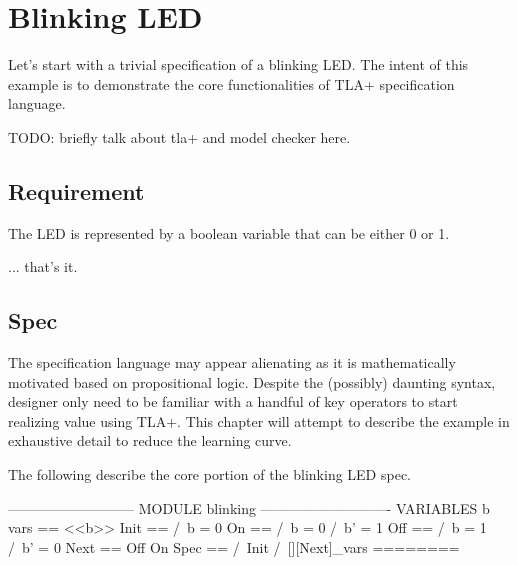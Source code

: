\chapter{Blinking LED}

Let's start with a trivial specification of a blinking LED. The intent of this example 
is to demonstrate the core functionalities of TLA+ specification language.

TODO: briefly talk about tla+ and model checker here.

\section{Requirement}

The LED is represented by a boolean variable that can be either 0 or 1.\newline

... that's it.

\section{Spec}

The specification language may appear alienating as it is mathematically
motivated based on propositional logic. Despite the (possibly) daunting syntax,
designer only need to be familiar with a handful of key operators to start
realizing value using TLA+. This chapter will attempt to describe the example in
exhaustive detail to reduce the learning curve.

The following describe the core portion of the blinking LED spec. 

\begin{tla}
--------------------------- MODULE blinking ----------------------------
VARIABLES b 
vars == <<b>>
Init ==
    /\ b = 0
On == 
    /\ b = 0
    /\ b' = 1
Off == 
    /\ b = 1
    /\ b' = 0
Next ==
    \/ Off 
    \/ On
Spec ==
    /\ Init
    /\ [][Next]_vars
========
\end{tla}
\begin{tlatex}
\@x{}\moduleLeftDash{}\moduleRightDash\@xx{}%
%
%
%
%
%
%
%
%
%
%
%
%
%
%
%
%
\@x{}\bottombar\@xx{}%
\end{tlatex}

